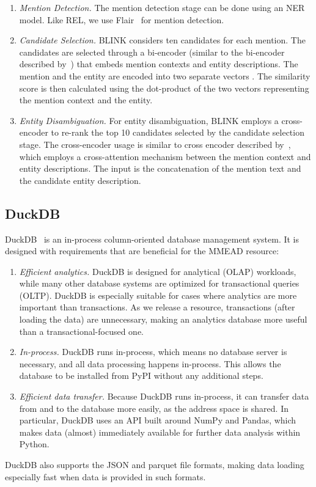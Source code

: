 \begin{enumerate}
    \item \emph{Mention Detection.} The mention detection stage can be done using an NER model. Like REL, we use Flair~\citep{flair} for mention detection.
	\item \emph{Candidate Selection.} BLINK considers ten candidates for each mention. The candidates are selected through a bi-encoder (similar to the bi-encoder described by~\citet{poly-encoders}) that embeds mention contexts and entity descriptions. The mention and the entity are encoded into two separate vectors . The similarity score is then calculated using the dot-product of the two vectors representing the mention context and the entity.  
	\item \emph{Entity Disambiguation.} For entity disambiguation, BLINK employs a cross-encoder to re-rank the top 10 candidates selected by the candidate selection stage. The cross-encoder usage is similar to cross encoder described by~\citet{poly-encoders}, which employs a cross-attention mechanism between the mention context and entity descriptions. The input is the concatenation of the mention text and the candidate entity description.    
\end{enumerate}

\subsection{DuckDB}
DuckDB~\citep{duckdb} is an in-process column-oriented database management system. It is designed with requirements that are beneficial for the MMEAD resource:
\begin{enumerate}
    \item \emph{Efficient analytics.} DuckDB is designed for analytical (OLAP) workloads, while many other database systems are optimized for transactional queries (OLTP). DuckDB is especially suitable for cases where analytics are more important than transactions. As we release a resource, transactions (after loading the data) are unnecessary, making an analytics database more useful than a transactional-focused one.  
	\item \emph{In-process.} DuckDB runs in-process, which means no database server is necessary, and all data processing happens in-process. This allows the database to be installed from PyPI without any additional steps. 
	\item \emph{Efficient data transfer.} Because DuckDB runs in-process, it can transfer data from and to the database more easily, as the address space is shared. In particular, DuckDB uses an API built around NumPy and Pandas, which makes data (almost) immediately available for further data analysis within Python. 
\end{enumerate}
DuckDB also supports the JSON and parquet file formats, making data loading especially fast when data is provided in such formats.

